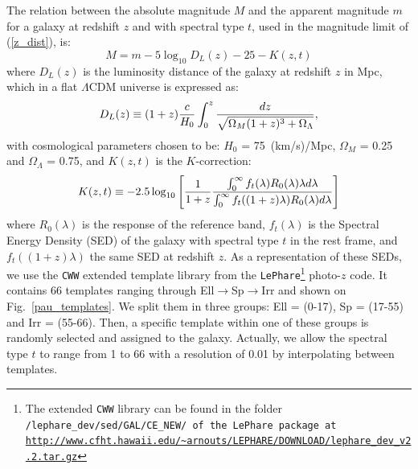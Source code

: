 The relation between the absolute magnitude $M$ and the apparent magnitude $m$ for a galaxy at redshift $z$ and with spectral type $t$, used in the magnitude limit of (\ref{z_dist}), is:
\begin{equation}
M =  m - 5 \log_{10}D_L(z) - 25 - K(z,t)
\label{abs_m}
\end{equation}
where $D_L(z)$ is the luminosity distance of the galaxy at redshift $z$ in Mpc, which in a flat $\Lambda$CDM universe is expressed as:
\begin{equation}
D_L(z) \equiv (1+z) {c \over H_0}\int_0^{z} {dz \over \sqrt{\Omega_M(1+z)^3 + \Omega_\Lambda} },
\end{equation}
with cosmological parameters chosen to be: $H_0$ = 75~(km/s)/Mpc, $\Omega_M$ = 0.25 and $\Omega_\Lambda$ = 0.75, and $K(z,t)$ is the $K$-correction:
\begin{equation}
K(z,t) \equiv -2.5 \log_{10} \left[{1 \over 1+z}{\int^{\infty}_{0} f_t(\lambda) R_0(\lambda)\lambda d\lambda  \over \int^{\infty}_{0} f_t((1+z)\lambda)R_0(\lambda)d\lambda}\right]
\end{equation}
where $R_0(\lambda)$ is the response of the reference band, $f_t(\lambda)$ is the Spectral Energy Density (SED) of the galaxy with spectral type $t$ in the rest frame, and $f_t((1+z)\lambda)$ the same SED at redshift $z$. As a representation of these SEDs, we use the \texttt{CWW} \citep{Coleman1980} extended template library from the \texttt{LePhare}\footnote{The extended \texttt{CWW} library can be found in the folder \tt{/lephare\_dev/sed/GAL/CE\_NEW/} of the \texttt{LePhare} package at \url{http://www.cfht.hawaii.edu/~arnouts/LEPHARE/DOWNLOAD/lephare\_dev\_v2.2.tar.gz}} photo-$z$ code. It contains 66 templates ranging through Ell$\rightarrow$Sp$\rightarrow$Irr and shown on Fig.~\ref{pau_templates}. We split them in three groups: Ell = (0-17), Sp = (17-55) and Irr = (55-66). Then, a specific template within one of these groups is randomly selected and assigned to the galaxy. Actually, we allow the spectral type $t$ to range from 1 to 66 with a resolution of 0.01 by interpolating between templates.
